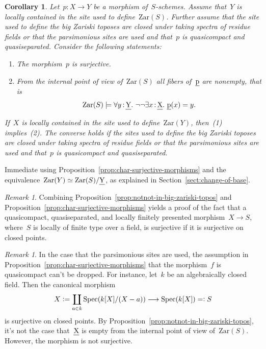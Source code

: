 \documentclass[10pt,reqno,a4paper]{amsbook}
\makeatletter
\theoremstyle{definition}
\theoremstyle{plain}
\newtheorem{cor}[defn]{Corollary}
\theoremstyle{remark}
\newtheorem{rem}[defn]{Remark}
\let\oldul\ul
\renewcommand{\ul}[1]{\text{\oldul{$#1$}}}
\newcommand{\Zar}{\mathrm{Zar}}
\DeclareMathOperator{\Spec}{Spec}
\newcommand{\?}{\,{:}\,}
\renewcommand{\_}{\mathpunct{.}\,}
\newcommand{\lra}{\longrightarrow}
\newcommand{\defeq}{\vcentcolon=}
\renewenvironment{proof}[1][\proofname]{\par
  \pushQED{\qed}%
  \normalfont \topsep6\p@\@plus6\p@\relax
  \trivlist
  \item[\hskip\labelsep
        \itshape
    #1\@addpunct{.}]\ignorespaces
}{%
  \popQED\endtrivlist\@endpefalse
}
\makeatother
\begin{document}
\begin{cor}\label{cor:char-surjective-morphisms-relative}
Let~$p : X \to Y$ be a morphism of~$S$-schemes. Assume that~$Y$ is locally
contained in the site used to define~$\Zar(S)$.
Further assume that the site used to define the big Zariski toposes are closed
under taking spectra of residue fields or that the parsimonious sites are used
and that~$p$ is quasicompact and quasiseparated.
Consider the following statements:
\begin{enumerate}
\item The morphism~$p$ is surjective.
\item From the internal point of view of~$\Zar(S)$ all fibers of~$\ul{p}$ are
nonempty, that is
\[ \Zar(S) \models \forall y\?\ul{Y}\_
  \neg\neg \exists x\?\ul{X}\_ \ul{p}(x) = y. \]
\end{enumerate}
If~$X$ is locally contained in the
site used to define~$\Zar(Y)$, then~(1) implies~(2). The converse holds if the
sites used to define the big Zariski toposes are closed under taking spectra of
residue fields or that the parsimonious sites are used and that~$p$ is
quasicompact and quasiseparated.
\end{cor}

\begin{proof}Immediate using Proposition~\ref{prop:char-surjective-morphisms}
and the equivalence~$\Zar(Y) \simeq \Zar(S)/\ul{Y}$,
as explained in Section~\ref{sect:change-of-base}.
\end{proof}

\begin{rem}Combining Proposition~\ref{prop:notnot-in-big-zariski-topos} and
Proposition~\ref{prop:char-surjective-morphisms} yields a proof of the fact
that a quasicompact, quasiseparated, and locally finitely presented morphism~$X \to S$, where~$S$ is locally of
finite type over a field, is surjective if it is surjective on closed points.
\end{rem}

\begin{rem}In the case that the parsimonious sites are used, the assumption in
Proposition~\ref{prop:char-surjective-morphisms} that the morphism~$f$ is
quasicompact can't be dropped. For instance, let~$k$ be an
algebraically closed field. Then the canonical morphism
\[ X \defeq \coprod_{a \in k} \Spec(k[X]/(X-a)) \lra \Spec(k[X]) =\vcentcolon S \]
is surjective on closed points. By Proposition~\ref{prop:notnot-in-big-zariski-topos},
it's not the case that~$\ul{X}$ is empty from the internal point of view
of~$\Zar(S)$. However, the morphism is not surjective.
\end{rem}
\end{document}

